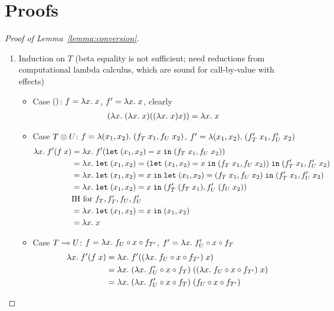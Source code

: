 
\section{Proofs}
\label{sec:properties}


\begin{proof}[Proof of Lemma~\ref{lemma:conversion}]
  \begin{enumerate}
  \item Induction on $T$ (beta equality is not sufficient; need
    reductions from computational lambda calculus, which are sound for
    call-by-value with effects)
    \begin{itemize}
    \item Case $()$: $f = \lambda x.\; x$, $f' = \lambda x.\; x$, clearly
      \begin{align*}
        (\lambda x.\; (\lambda x.\; x) ((\lambda x.\; x) x)) &= \lambda x.\; x
      \end{align*}
    \item Case $T \otimes U$: $f = \lambda (x_1,x_2).\; (f_T \; x_1, f_U \;
      x_2)$, $f' = \lambda (x_1,x_2).\; (f'_T \; x_1, f'_U \; x_2)$
      \begin{align*}
        \lambda x.\; f' (f\; x)
        &= \lambda x.\; f' (\mathtt{let}\; (x_1,x_2) = x \;\mathtt{in}\; (f_T \; x_1, f_U \; x_2)) \\
        &= \lambda x.\; \mathtt{let}\; (x_1,x_2) =  (\mathtt{let}\; (x_1,x_2) = x \;\mathtt{in}\; (f_T \; x_1,
          f_U \; x_2)) \;\mathtt{in}\;  (f'_T \; x_1, f'_U \; x_2)\\
        &= \lambda x.\;
          \mathtt{let}\; (x_1,x_2) = x \;\mathtt{in}\; \mathtt{let}\; (x_1,x_2) =  (f_T \; x_1,
          f_U \; x_2) \;\mathtt{in}\;  (f'_T \; x_1, f'_U \; x_2)\\
        &= \lambda x.\;
          \mathtt{let}\; (x_1,x_2) = x \;\mathtt{in}\;  (f'_T \; (f_T\; x_1), f'_U \; (f_U\;
          x_2))\\
        & \text{IH for }f_T, f_T', f_U, f_U' \\
        &= \lambda x.\;
          \mathtt{let}\; (x_1,x_2) = x \;\mathtt{in}\;  (x_1,x_2)\\
        &= \lambda x.\; x
      \end{align*}
    \item Case $T \multimap U$: $f = \lambda x.\; f_U \circ x \circ f_{T'}$, $f'
      = \lambda x.\; f'_U \circ x \circ f_T$
      \begin{align*}
        \ELam x f' (f\; x)
        &= \ELam x f' ((\ELam x f_U \circ x \circ f_{T'})\; x) \\
        &= \ELam x (\ELam x f'_U \circ x \circ f_T)\; ((\ELam x f_U \circ x \circ f_{T'})\; x) \\
        &= \ELam x (\ELam x f'_U \circ x \circ f_T)\; (f_U \circ x \circ f_{T'}) \\

\end{align*}
\end{itemize}
\end{enumerate}
\end{proof}
